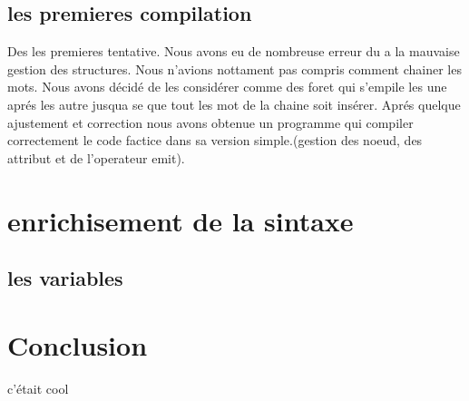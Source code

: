 \documentclass[12pt]{article}
\begin{document}
\subsection{les premieres compilation}

Des les premieres tentative. Nous avons eu de nombreuse erreur du a la mauvaise
gestion des structures. Nous n'avions nottament pas compris comment chainer
les mots. Nous avons décidé de les considérer comme des foret qui s'empile les
une aprés les autre jusqua se que tout les mot de la chaine soit insérer.
Aprés quelque ajustement et correction nous avons obtenue un programme qui
compiler correctement le code factice dans sa version simple.(gestion des noeud,
des attribut et de l'operateur emit).

\newpage


\section{enrichisement de la sintaxe}

\subsection{les variables}



\section{Conclusion}
c'était cool
\end{document}
